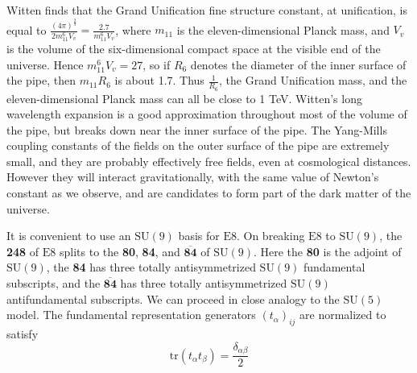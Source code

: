 \documentclass[a4paper,12pt,oneside]{article}
\begin{document}
Witten \cite{Witten} finds that the Grand Unification fine structure
constant, at unification, is equal to $\frac{(4\pi)^{\frac{2}{3}}}
{2m_{11}^6V_v}=\frac{2.7}{m_{11}^6V_v}$, where $m_{11}$ is the 
eleven-dimensional Planck mass, and $V_v$ is the volume of the 
six-dimensional compact space at the visible end of the universe.
Hence $m_{11}^6V_v=27$, so if $R_6$ denotes the diameter of the 
inner surface of the pipe, then $m_{11}R_6$ is about 1.7.  Thus 
$\frac{1}{R_6}$, the Grand Unification mass, and the 
eleven-dimensional Planck mass can all be close to 1 TeV.  Witten's
long wavelength expansion \cite{Witten} is a good approximation 
throughout most of the volume of the pipe, but breaks down near the 
inner surface of the pipe.  The Yang-Mills coupling constants of 
the fields on the outer surface of the pipe are extremely small, and
they are probably effectively free fields, even at cosmological 
distances.  However they will interact gravitationally, with the 
same value of Newton's constant as we observe, and are candidates to
form part of the dark matter of the universe.

It is convenient to use an $\mathrm{SU}(9)$ basis for $\mathrm{E}8$.
On breaking $\mathrm{E}8$ to $\mathrm{SU}(9)$, the \textbf{248} of
$\mathrm{E}8$ splits to the \textbf{80}, \textbf{84}, and 
$\mathbf{\overline{84}}$ of $\mathrm{SU}(9)$.  Here the \textbf{80} is 
the adjoint of $\mathrm{SU}(9)$, the \textbf{84} has three totally
antisymmetrized $\mathrm{SU}(9)$ fundamental subscripts, and the
$\mathbf{\overline{84}}$ has three totally antisymmetrized 
$\mathrm{SU}(9)$ antifundamental subscripts.  We can proceed in 
close analogy to the $\mathrm{SU}(5)$ model.  The 
fundamental representation generators $\left(t_\alpha\right)_{ij}$ 
are normalized to satisfy \cite{Rosner}
\begin{equation}\label{normalization}
\mathrm{tr}\left(t_\alpha t_\beta\right)=\frac{\delta_{\alpha\beta}}
{2}
\end{equation}
\end{document}
